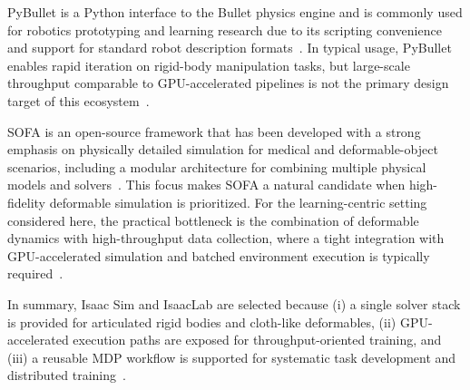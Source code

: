 PyBullet is a Python interface to the Bullet physics engine and is commonly used for robotics prototyping and learning research due to its scripting convenience and support for standard robot description formats~\cite{pybullet_home}.
In typical usage, PyBullet enables rapid iteration on rigid-body manipulation tasks, but large-scale throughput comparable to \ac{GPU}-accelerated pipelines is not the primary design target of this ecosystem~\cite{pybullet_home}. %

SOFA is an open-source framework that has been developed with a strong emphasis on physically detailed simulation for medical and deformable-object scenarios, including a modular architecture for combining multiple physical models and solvers~\cite{Allard2007SOFA}.
This focus makes SOFA a natural candidate when high-fidelity deformable simulation is prioritized.
For the learning-centric setting considered here, the practical bottleneck is the combination of deformable dynamics with high-throughput data collection, where a tight integration with \ac{GPU}-accelerated simulation and batched environment execution is typically required~\cite{Makoviychuk2021IsaacGym}. %

In summary, Isaac Sim and IsaacLab are selected because (i) a single solver stack is provided for articulated rigid bodies and cloth-like deformables, (ii) \ac{GPU}-accelerated execution paths are exposed for throughput-oriented training, and (iii) a reusable \ac{MDP} workflow is supported for systematic task development and distributed training~\cite{isaac_sim_510_physics_fundamentals,physx_541_gpu_rigid_bodies,isaaclab_mdp_api,isaaclab_multi_gpu_doc}.

